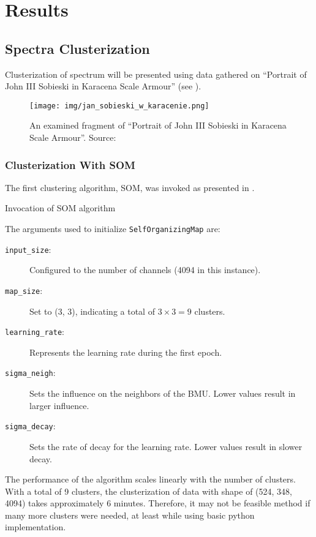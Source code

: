 \section{Results}
\subsection{Spectra Clusterization}
Clusterization of spectrum will be presented using data gathered on ``Portrait of John III Sobieski in Karacena Scale Armour'' (see ).
\begin{figure}[H] 
  \centering     
  \texttt{[image: img/jan\_sobieski\_w\_karacenie.png]} 
  \caption{An examined fragment of ``Portrait of John III Sobieski in Karacena Scale Armour''. Source: \cite{wikimediaSobieskiPortrai} }
  \label{fig:sobieski_fragment}
\end{figure}

\subsubsection{Clusterization With SOM}
The first clustering algorithm, SOM, was invoked as presented in .
\newenvironment{longlistingG}{\captionsetup{type=listing, width=0.8\textwidth}}{}
\begin{longlistingG}
    \caption{Invocation of SOM algorithm}
    \label{lst:som-invocation}
\end{longlistingG}
\vspace{12pt}

The arguments used to initialize \texttt{SelfOrganizingMap} are:
\begin{description}
    \item[\texttt{input\_size}:] Configured to the number of channels (4094 in this instance).
    \item[\texttt{map\_size}:] Set to (3, 3), indicating a total of $3 \times 3 = 9$ clusters.
    \item[\texttt{learning\_rate}:] Represents the learning rate during the first epoch.
    \item[\texttt{sigma\_neigh}:] Sets the influence on the neighbors of the BMU. Lower values result in larger influence.
    \item[\texttt{sigma\_decay}:] Sets the rate of decay for the learning rate. Lower values result in slower decay.
\end{description}
The performance of the algorithm scales linearly with the number of clusters. 
With a total of 9 clusters, the clusterization of data with shape of (524, 348, 4094) takes approximately 6 minutes. 
Therefore, it may not be feasible method if many more clusters were needed, at least while using basic python implementation.

